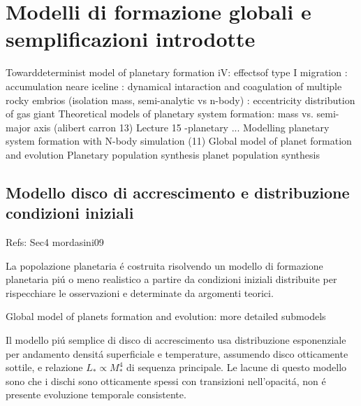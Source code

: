 {\let\clearpage\relax\let\cleardoublepage\relax
\chapter{Modelli di formazione globali e semplificazioni introdotte}
}

\begin{workout}
Towarddeterminist model of planetary formation iV: effectsof type I migration
									: accumulation neare iceline
									: dynamical intaraction and coagulation of multiple rocky embrios (isolation mass, semi-analytic vs n-body)
									: eccentricity distribution of gas giant
Theoretical models of planetary system formation: mass vs. semi-major axis	(alibert carron 13)			Lecture 15 -planetary ...
Modelling planetary system formation with N-body simulation (11)
Global model of planet formation and evolution
Planetary population synthesis
planet population synthesis					
\end{workout}

\section{Modello disco di accrescimento e distribuzione condizioni iniziali}

Refs: Sec4 mordasini09

La popolazione planetaria \'e costruita risolvendo un modello di formazione planetaria pi\'u o meno realistico a partire da condizioni iniziali distribuite per rispecchiare le osservazioni e determinate da argomenti teorici.

\begin{workout}
Global model of planets formation and evolution: more detailed submodels
\end{workout}

Il modello pi\'u semplice di disco di accrescimento usa distribuzione esponenziale per andamento densit\'a superficiale e temperature, assumendo disco otticamente sottile, e relazione $L_*\propto M_*^4$ di sequenza principale. Le lacune di questo modello sono che i dischi sono otticamente spessi con transizioni nell'opacit\'a, non \'e presente evoluzione temporale consistente.


